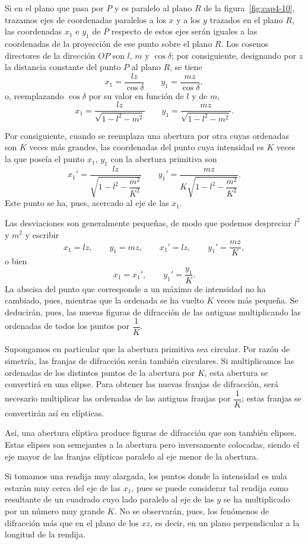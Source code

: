 Si en el plano que pasa por $P$ y es paralelo al plano $R$ de la
figura~\ref{fig:cap4-10}, trazamos ejes de coordenadas paralelos a los
$x$ y a los $y$ trazados en el plano $R$, las coordenadas $x_1$ e $y_1$
de $P$ respecto de estos ejes serán iguales a las coordenadas de la
proyección de ese punto sobre el plano $R$. Los cosenos directores de la
dirección $OP$ son $l$, $m$ y $\cos\delta$; por consiguiente, designando
por $z$ la distancia constante del punto $P$ al plano $R$, se tiene
\[
x_1 = \frac{lz}{\cos\delta}\qquad y_1 = \frac{mz}{\cos\delta},
\]
o, reemplazando $\cos\delta$ por su valor en función de $l$ y de $m$,
\[
x_1 = \frac{lz}{\sqrt{1-l^2-m^2}}\qquad y_1 = \frac{mz}{\sqrt{1-l^2-m^2}}.
\]

Por consiguiente, cuando se reemplaza una abertura por otra cuyas
ordenadas son $K$ veces más grandes, las coordenadas del punto cuya
intensidad es $K$ veces la que poseía el punto $x_1$, $y_1$ con la
abertura primitiva son
\[
x_1' = \frac{lz}{\sqrt{1-l^2-\dfrac{m^2}{K^2}}}\qquad
y_1' = \frac{mz}{K\sqrt{1-l^2-\dfrac{m^2}{K^2}}}.
\]
Este punto se ha, pues, acercado al eje de las $x_1$.

Las desviaciones son generalmente pequeñas, de modo que podemos
despreciar $l^2$ y $m^2$ y escribir
\[
x_1=lz,\qquad y_1=mz,\qquad x_1'=lz,\qquad y_1'=\frac{mz}{K},
\]
o bien
\[
x_1=x_1',\qquad y_1'=\frac{y_1}{K}.
\]
La abscisa del punto que corresponde a un máximo de intensidad no ha
cambiado, pues, mientras que la ordenada se ha vuelto $K$ veces más
pequeña. Se deducirán, pues, las nuevas figuras de difracción de las
antiguas multiplicando las ordenadas de todos los puntos por
$\dfrac{1}{K}$.

Supongamos en particular que la abertura primitiva sea circular. Por
razón de simetría, las franjas de difracción serán también circulares.
Si multiplicamos las ordenadas de los distintos puntos de la abertura por
$K$, esta abertura se convertirá en una elipse. Para obtener las nuevas
franjas de difracción, será necesario multiplicar las ordenadas de las
antiguas franjas por $\dfrac1K$; estas franjas se convertirán así en
elípticas.

Así, una abertura elíptica produce figuras de difracción que son también
elipses. Estas elipses son semejantes a la abertura pero inversamente
colocadas, siendo el eje mayor de las franjas elípticas paralelo al eje
menor de la abertura.

Si tomamos una rendija muy alargada, los puntos donde la intensidad es
nula estarán muy cerca del eje de las $x_1$, pues se puede considerar tal
rendija como resultante de un cuadrado cuyo lado paralelo al eje de las
$y$ se ha multiplicado por un número muy grande $K$. No se observarán,
pues, los fenómenos de difracción más que en el plano de los $xz$, es
decir, en un plano perpendicular a la longitud de la rendija.

